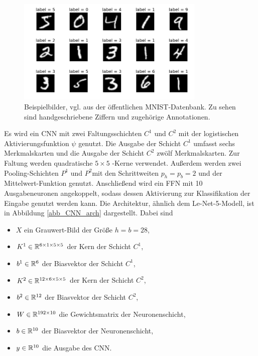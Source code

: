 \begin{figure}[h]
    \includegraphics[width=0.8\textwidth]{pics/chapters/CCN/mnist.png}
    \centering
    \caption{Beispielbilder, vgl. \cite{DBLP:journals/pieee/LeCunBBH98} aus der öffentlichen MNIST-Datenbank. Zu sehen sind handgeschriebene Ziffern und zugehörige Annotationen.}
    \label{mnistpic}
\end{figure}

Es wird ein CNN mit zwei Faltungsschichten $C^1$ und $C^2$ mit der logistischen Aktivierungsfunktion $\psi$ genutzt. Die Ausgabe der Schicht $C^1$ umfasst sechs Merkmalskarten und die Ausgabe der Schicht $C^2$ zwölf Merkmalskarten. Zur Faltung werden quadratische $5 \times 5$ -Kerne verwendet. Außerdem werden zwei Pooling-Schichten $P^1$ und $P^2$mit den Schrittweiten $p_h=p_b=2$ und der Mittelwert-Funktion genutzt. Anschließend wird ein FFN mit 10 Ausgabeneuronen angekoppelt, sodass dessen Aktivierung zur Klassifikation der Eingabe genutzt werden kann. Die Architektur, ähnlich dem Le-Net-5-Modell\cite{DBLP:journals/pieee/LeCunBBH98}, ist in Abbildung \ref{abb_CNN_arch} dargestellt. Dabei sind

\begin{itemize}
    \item $X$ ein Grauwert-Bild der Größe $h=b=28$,
    \item $K^1 \in \mathbb{R}^{6 \times 1 \times 5 \times 5}$ der Kern der Schicht $C^1$,
    \item $b^1 \in \mathbb{R}^6$ der Biasvektor der Schicht $C^1$,
    \item $K^2 \in \mathbb{R}^{12 \times 6 \times 5 \times 5}$ der Kern der Schicht $C^2$,
    \item $b^2 \in \mathbb{R}^{12}$ der Biasvektor der Schicht $C^2$,
    \item $W \in \mathbb{R}^{192 \times 10}$ die Gewichtsmatrix der Neuronenschicht,
    \item $b \in \mathbb{R}^{10}$ der Biasvektor der Neuronenschicht,
    \item $y \in \mathbb{R}^{10}$ die Ausgabe des CNN. 
\end{itemize}

